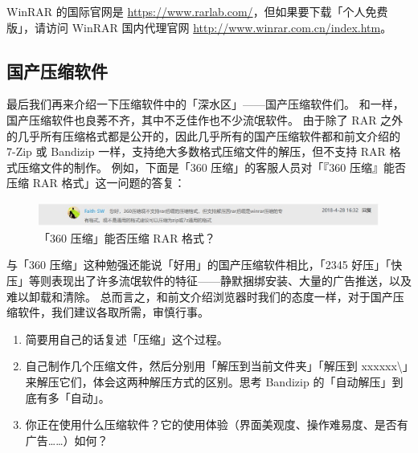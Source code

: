 WinRAR 的国际官网是 \url{https://www.rarlab.com/}，但如果要下载「个人免费版」，请访问 WinRAR 国内代理官网 \url{http://www.winrar.com.cn/index.htm}。

\subsection{国产压缩软件}

最后我们再来介绍一下压缩软件中的「深水区」——国产压缩软件们。
和一样，国产压缩软件也良莠不齐，其中不乏佳作也不少流氓软件。
由于除了 RAR 之外的几乎所有压缩格式都是公开的，因此几乎所有的国产压缩软件都和前文介绍的 7-Zip 或 Bandizip 一样，支持绝大多数格式压缩文件的解压，但不支持 RAR 格式压缩文件的制作。
例如，下面是「360 压缩」的客服人员对「『360 压缩』能否压缩 RAR 格式」这一问题的答复：

\begin{figure}[htb!]
  \centering
  \includegraphics[width=12cm]{assets/360_Zip.jpg}
  \caption{「360 压缩」能否压缩 RAR 格式？}
  \label{360_Zip}
\end{figure}

与「360 压缩」这种勉强还能说「好用」的国产压缩软件相比，「2345 好压」「快压」等则表现出了许多流氓软件的特征——静默捆绑安装、大量的广告推送，以及难以卸载和清除。
总而言之，和前文介绍浏览器时我们的态度一样，对于国产压缩软件，我们建议各取所需，审慎行事。

\practice

\begin{enumerate}
  \item 简要用自己的话复述「压缩」这个过程。
  \item 自己制作几个压缩文件，然后分别用「解压到当前文件夹」「解压到 xxxxxx\textbackslash 」来解压它们，体会这两种解压方式的区别。思考 Bandizip 的「自动解压」到底有多「自动」。
  \item 你正在使用什么压缩软件？它的使用体验（界面美观度、操作难易度、是否有广告……）如何？
\end{enumerate}